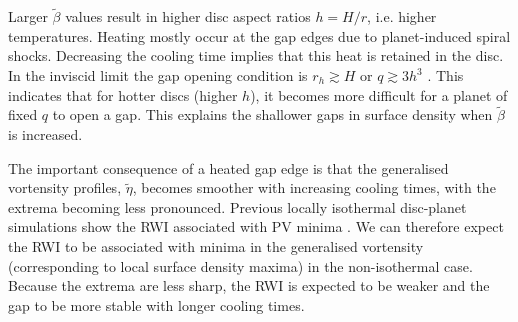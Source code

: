 
Larger $\tilde\beta$ values result in higher disc aspect ratios $h=H/r$,
i.e. higher temperatures. Heating mostly occur at the gap edges
due to planet-induced spiral shocks. Decreasing the cooling time
implies that this heat is retained in the disc. In the inviscid limit the gap
opening condition is $r_h\gtrsim H$ or $q\gtrsim 3h^3$
\citep{crida06}. 
This indicates that for hotter discs (higher
$h$), it becomes more difficult for a planet of fixed $q$ to open a
gap. This explains the shallower gaps in surface density when
$\tilde{\beta}$ is increased. 


The important consequence of a heated gap edge is that the
generalised vortensity profiles, $\tilde{\eta}$, becomes smoother with increasing
cooling times, with the extrema becoming less pronounced. Previous locally
isothermal disc-planet simulations show the RWI associated with PV
minima \citep{li05,lin10}. We can therefore expect the RWI to be associated with
minima in the generalised vortensity (corresponding to local surface
density maxima) in the non-isothermal case. Because the extrema are
less sharp, the RWI is expected to be weaker and the gap to be more
stable with longer cooling times.  



